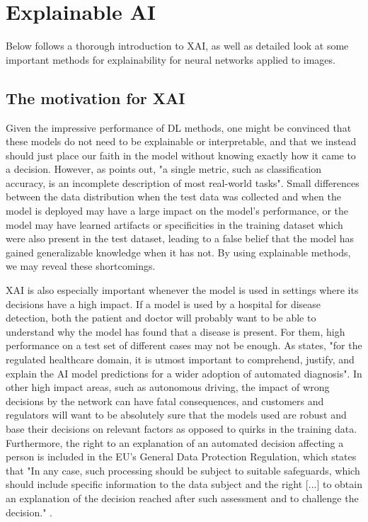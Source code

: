 \documentclass[UKenglish]{uiomasterthesis} %
\theoremstyle{definition}
\begin{document}
\section{Explainable AI} \label{chapter:xai}

Below follows a thorough introduction to XAI, as well as detailed look at some important methods for explainability for neural networks applied to images.

\subsection{The motivation for XAI}

Given the impressive performance of DL methods, one might be convinced that these models do not need to be explainable or interpretable, and that we instead should just place our faith in the model without knowing exactly how it came to a decision. However, as \cite{doshivelez} points out, "a single metric, such as classification accuracy, is an incomplete description of most real-world tasks". Small differences between the data distribution when the test data was collected and when the model is deployed may have a large impact on the model's performance, or the model may have learned artifacts or specificities in the training dataset which were also present in the test dataset, leading to a false belief that the model has gained generalizable knowledge when it has not. By using explainable methods, we may reveal these shortcomings.

XAI is also especially important whenever the model is used in settings where its decisions have a high impact. If a model is used by a hospital for disease detection, both the patient and doctor will probably want to be able to understand why the model has found that a disease is present. For them, high performance on a test set of different cases may not be enough. As \cite{xaisurvey} states, "for the regulated healthcare domain, it is utmost important to comprehend, justify, and explain the AI model predictions for a wider adoption of automated diagnosis". In other high impact areas, such as autonomous driving, the impact of wrong decisions by the network can have fatal consequences, and customers and regulators will want to be absolutely sure that the models used are robust and base their decisions on relevant factors as opposed to quirks in the training data. Furthermore, the right to an explanation of an automated decision affecting a person is included in the EU's General Data Protection Regulation, which states that "In any case, such processing should be subject to suitable safeguards, which should include specific information to the data subject and the right [...] to obtain an explanation of the decision reached after such assessment and to challenge the decision." \cite{gdpr}.
\end{document}
